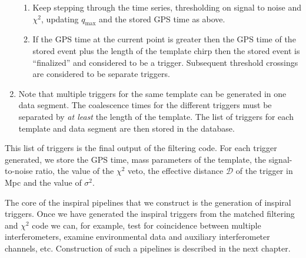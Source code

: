 \begin{enumerate}
\begin{enumerate}
\item Keep stepping through the time series, thresholding on signal to noise
and $\chi^2$, updating $q_{\mathrm{max}}$ and the stored GPS time as above.

\item If the GPS time at the current point is greater then the GPS time of the
stored event plus the length of the template chirp then the stored event is
``finalized'' and considered to be a trigger. Subsequent threshold crossings are
considered to be separate triggers.
\end{enumerate}

\item Note that multiple triggers for the same template can be generated in
one data segment. The coalescence times for the different triggers must be
separated by \textit{at least} the length of the template.  The list of
triggers for each template and data segment are then stored in the database. 
\end{enumerate}

This list of triggers is the final output of the filtering code. For each
trigger generated, we store the GPS time, mass parameters of the template,
the signal-to-noise ratio, the value of the $\chi^2$ veto, the effective
distance $\mathcal{D}$ of the trigger in Mpc and the value of $\sigma^2$.

The core of the inspiral pipelines that we construct is the generation of
inspiral triggers. Once we have generated the inspiral triggers from the
matched filtering and $\chi^2$ code we can, for example, test for coincidence
between multiple interferometers, examine environmental data and auxiliary
interferometer channels, etc. Construction of such a pipelines is described in
the next chapter.
